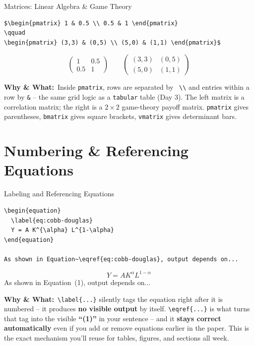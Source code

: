 \documentclass[11pt,aspectratio=169]{beamer}
\newcommand{\whybox}[1]{%
  \vspace{2pt}
  {\scriptsize\raggedright\textcolor{red!55!black}{\textbf{Why \& What:}}~#1\par}
}
\begin{document}
\begin{frame}[fragile]{Matrices: Linear Algebra \& Game Theory}
  \begin{lstlisting}
$\begin{pmatrix} 1 & 0.5 \\ 0.5 & 1 \end{pmatrix}
\qquad
\begin{pmatrix} (3,3) & (0,5) \\ (5,0) & (1,1) \end{pmatrix}$
  \end{lstlisting}
  \begin{outputbox}
    \[ \begin{pmatrix} 1 & 0.5 \\ 0.5 & 1 \end{pmatrix}
       \qquad
       \begin{pmatrix} (3,3) & (0,5) \\ (5,0) & (1,1) \end{pmatrix} \]
  \end{outputbox}
  \whybox{Inside \texttt{pmatrix}, rows are separated by \texttt{
  \textbackslash\textbackslash} and entries within a row by \texttt{\&}
  -- the same grid logic as a \texttt{tabular} table (Day 3). The left
  matrix is a correlation matrix; the right is a $2\times2$
  game-theory payoff matrix. \texttt{pmatrix} gives parentheses,
  \texttt{bmatrix} gives square brackets, \texttt{vmatrix} gives
  determinant bars.}
\end{frame}

\section{Numbering \& Referencing Equations}

\begin{frame}[fragile]{Labeling and Referencing Equations}
  \begin{lstlisting}
\begin{equation}
  \label{eq:cobb-douglas}
  Y = A K^{\alpha} L^{1-\alpha}
\end{equation}

As shown in Equation~\eqref{eq:cobb-douglas}, output depends on...
  \end{lstlisting}
  \begin{outputbox}
    \[ Y = AK^{\alpha}L^{1-\alpha} \tag{1} \]
    \small As shown in Equation~(1), output depends on...
  \end{outputbox}
  \whybox{\texttt{\textbackslash label\{...\}} silently tags the
  equation right after it is numbered -- it produces \textbf{no
  visible output} by itself. \texttt{\textbackslash eqref\{...\}} is
  what turns that tag into the visible \textbf{``(1)''} in your
  sentence -- and it \textbf{stays correct automatically} even if you
  add or remove equations earlier in the paper. This is the exact
  mechanism you'll reuse for tables, figures, and sections all week.}
\end{frame}
\end{document}
